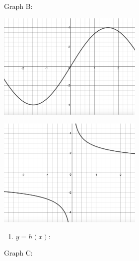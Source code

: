 \documentclass{ximera}
\begin{document}
\begin{center}
\begin{multicols}{2}
\begin{enumerate}
\setcounter{HW}{\value{enumi}}
\end{enumerate}

Graph B:

\end{multicols}




\begin{multicols}{2}

\includegraphics[width=2.75in]{./IntroductiontoDerivativesGraphics/MatchFunc06.jpeg}

\includegraphics[width=2.75in]{./IntroductiontoDerivativesGraphics/MatchDeriv04.jpeg}

\end{multicols}



\begin{multicols}{2}

\begin{enumerate}
\setcounter{enumi}{\value{HW}}

\item \label{MatchFcnDerivative2last}  $y = h(x)$:

\setcounter{HW}{\value{enumi}}
\end{enumerate}

Graph C:

\end{multicols}



\begin{multicols}{2}


\end{multicols}
\end{center}
\end{document}
